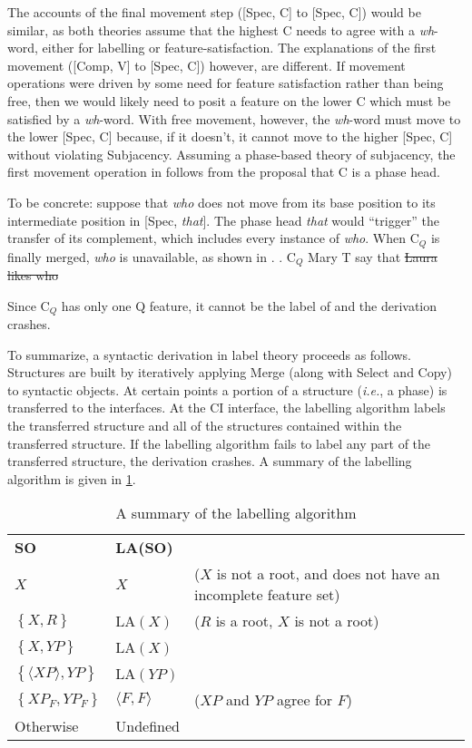 \documentclass[MilwayThesis]{subfiles}
\begin{document}
The accounts of the final movement step ([Spec, C] to [Spec, C]) would be similar, as both theories assume that the highest C needs to agree with a \textit{wh}-word, either for labelling or feature-satisfaction.
The explanations of the first movement ([Comp, V] to [Spec, C]) however, are different.
If movement operations were driven by some need for feature satisfaction rather than being free, then we would likely need to posit a feature on the lower C which must be satisfied by a \textit{wh}-word.
With free movement, however, the \textit{wh}-word must move to the lower [Spec, C] because, if it doesn't, it cannot move to the higher [Spec, C] without violating Subjacency.
Assuming a phase-based theory of subjacency, the first movement operation in \Last follows from the proposal that C is a phase head.

To be concrete: suppose that \textit{who} does not move from its base position to its intermediate position in [Spec, \textit{that}].
The phase head \textit{that} would ``trigger'' the transfer of its complement, which includes every instance of \textit{who}.
When C$_{Q}$ is finally merged, \textit{who} is unavailable, as shown in \Next. 
\ex. C$_{Q}$ Mary T say that \sout{Laura likes who}

Since C$_{Q}$ has only one Q feature, it cannot be the label of \Last and the derivation crashes.

To summarize, a syntactic derivation in label theory proceeds as follows.
Structures are built by iteratively applying Merge (along with Select and Copy) to syntactic objects.
At certain points a portion of a structure (\textit{i.e.}, a phase) is transferred to the interfaces.
At the CI interface, the labelling algorithm labels the transferred structure and all of the structures contained within the transferred structure.
If the labelling algorithm fails to label any part of the transferred structure, the derivation crashes.
A summary of the labelling algorithm is given in \cref{tab:LA-results}.
\begin{table}
	\centering
	\begin{tabular}[t]{llp{5cm}}
		\textbf{SO} & \textbf{LA(SO)} & \\
		\cline{1-2}
		$X$ & $X$ & ($X$ is not a root, and does not have an incomplete feature set)\\
		$\left\{ X, R \right\}$ & LA$(X)$ & ($R$ is a root, $X$ is not a root)\\
		$\left\{ X, YP \right\}$ & LA$(X)$ & \\
		$\left\{ \langle XP\rangle, YP \right\}$ & LA$(YP)$ & \\
		$\left\{ XP_F, YP_F \right\}$ & $\langle F,F\rangle$ & ($XP$ and $YP$ agree for $F$)\\
		Otherwise & Undefined &
	\end{tabular}
	\caption{A summary of the labelling algorithm}
	\label{tab:LA-results}
\end{table}
\end{document}

